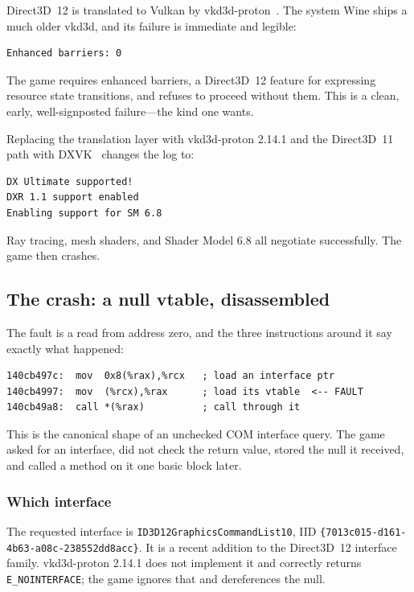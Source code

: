 Direct3D~12 is translated to Vulkan by vkd3d-proton~\cite{vkd3d}. The
system Wine ships a much older vkd3d, and its failure is immediate and legible:

\begin{lstlisting}
Enhanced barriers: 0
\end{lstlisting}

The game requires enhanced barriers, a Direct3D~12 feature for expressing
resource state transitions, and refuses to proceed without them. This is a clean,
early, well-signposted failure---the kind one wants.

Replacing the translation layer with vkd3d-proton 2.14.1 and the Direct3D~11
path with DXVK~\cite{dxvk} changes the log to:

\begin{lstlisting}
DX Ultimate supported!
DXR 1.1 support enabled
Enabling support for SM 6.8
\end{lstlisting}

Ray tracing, mesh shaders, and Shader Model 6.8 all negotiate successfully. The
game then crashes.

\subsection{The crash: a null vtable, disassembled}

The fault is a read from address zero, and the three instructions around it say
exactly what happened:

\begin{lstlisting}
140cb497c:  mov  0x8(%rax),%rcx   ; load an interface ptr
140cb4997:  mov  (%rcx),%rax      ; load its vtable  <-- FAULT
140cb49a8:  call *(%rax)          ; call through it
\end{lstlisting}

This is the canonical shape of an unchecked COM interface query. The game asked
for an interface, did not check the return value, stored the null it received,
and called a method on it one basic block later.

\subsubsection{Which interface}

The requested interface is \verb|ID3D12GraphicsCommandList10|, IID
\verb|{7013c015-d161-4b63-a08c-238552dd8acc}|. It is a recent addition to the
Direct3D~12 interface family. vkd3d-proton 2.14.1 does not implement it and
correctly returns \verb|E_NOINTERFACE|; the game ignores that and dereferences
the null.

